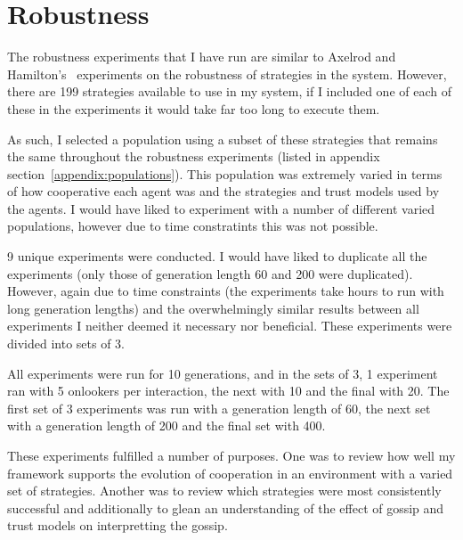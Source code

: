\documentclass[]{final_report}
\begin{document}
\section{Robustness}
The robustness experiments that I have run are similar to Axelrod and Hamilton's~\cite{evolution_of_cooperation} experiments on the robustness of strategies in the system. However, there are 199 strategies available to use in my system, if I included one of each of these in the experiments it would take far too long to execute them.\par 
As such, I selected a population using a subset of these strategies that remains the same throughout the robustness experiments (listed in appendix section~\ref{appendix:populations}). This population was extremely varied in terms of how cooperative each agent was and the strategies and trust models used by the agents. I would have liked to experiment with a number of different varied populations, however due to time constratints this was not possible.\par 
9 unique experiments were conducted. I would have liked to duplicate all the experiments (only those of generation length 60 and 200 were duplicated). However, again due to time constraints (the experiments take hours to run with long generation lengths) and the overwhelmingly similar results between all experiments I neither deemed it necessary nor beneficial. These experiments were divided into sets of 3.\par 
All experiments were run for 10 generations, and in the sets of 3, 1 experiment ran with 5 onlookers per interaction, the next with 10 and the final with 20. The first set of 3 experiments was run with a generation length of 60, the next set with a generation length of 200 and the final set with 400.\par
These experiments fulfilled a number of purposes. One was to review how well my framework supports the evolution of cooperation in an environment with a varied set of strategies. Another was to review which strategies were most consistently successful and additionally to glean an understanding of the effect of gossip and trust models on interpretting the gossip.
\end{document}

